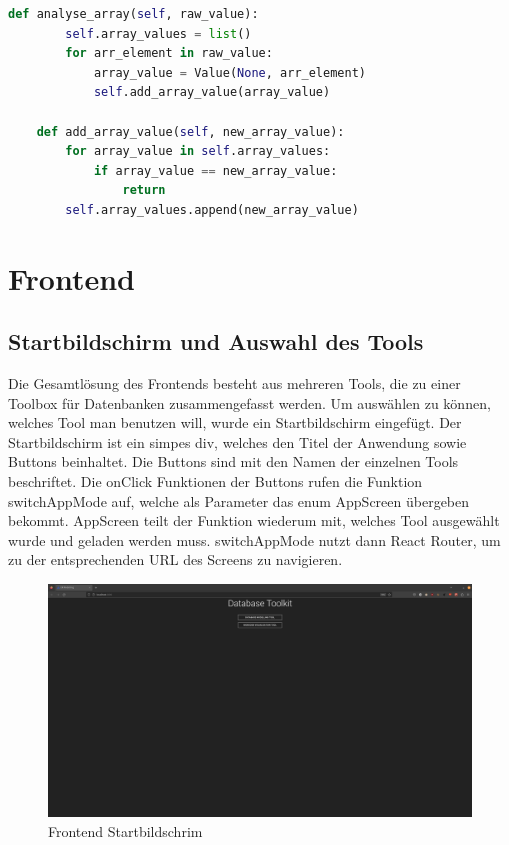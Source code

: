 \begin{lstlisting}[language=python, caption={Value.analyse\_array},label={lst:backend_value_analyse_array}]
    def analyse_array(self, raw_value):
        self.array_values = list()
        for arr_element in raw_value:
            array_value = Value(None, arr_element)
            self.add_array_value(array_value)

    def add_array_value(self, new_array_value):
        for array_value in self.array_values:
            if array_value == new_array_value:
                return
        self.array_values.append(new_array_value)
\end{lstlisting}

\section{Frontend}
\label{sec:frontend}

\subsection{Startbildschirm und Auswahl des Tools}
\label{sub:fe_startbildschirm}

Die Gesamtlösung des Frontends besteht aus mehreren Tools, die zu einer Toolbox für Datenbanken zusammengefasst werden.
Um auswählen zu können, welches Tool man benutzen will, wurde ein Startbildschirm eingefügt.
Der Startbildschirm ist ein simpes div, welches den Titel der Anwendung sowie Buttons beinhaltet.
Die Buttons sind mit den Namen der einzelnen Tools beschriftet.
Die onClick Funktionen der Buttons rufen die Funktion switchAppMode auf, welche als Parameter das enum AppScreen übergeben bekommt.
AppScreen teilt der Funktion wiederum mit, welches Tool ausgewählt wurde und geladen werden muss.
switchAppMode nutzt dann React Router, um zu der entsprechenden URL des Screens zu navigieren.

\begin{figure}[H]
    \includegraphics[width=\textwidth]{images/frontend_titlescreen}
    \caption{Frontend Startbildschrim}
    \label{fig:frontend_titlescreen}
\end{figure}

